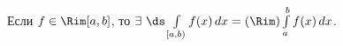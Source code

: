 
   Если $f\in\Rim[a,b]$, то $\exists\ \ds\int\limits_{[a,b)}f(x)\,dx=(\Rim)\int\limits_a^bf(x)\,dx$.
   